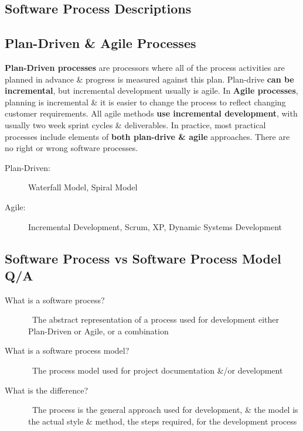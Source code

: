 \documentclass{report}
\begin{document}
\subsection{Software Process Descriptions}

\subsection{Plan-Driven \& Agile Processes}
\textbf{Plan-Driven processes} are processors where all of the process activities are planned in advance \& progress is measured against this plan. Plan-drive \textbf{can be incremental}, but incremental development usually is agile. In \textbf{Agile processes}, planning is incremental \& it is easier to change the process to reflect changing customer requirements. All agile methods \textbf{use incremental development}, with usually two week sprint cycles \& deliverables. In practice, most practical processes include elements of \textbf{both plan-drive \& agile} approaches. There are no right or wrong software processes.
\begin{description}
  \item [Plan-Driven:] Waterfall Model, Spiral Model
  \item [Agile:] Incremental Development, Scrum, XP, Dynamic Systems Development
\end{description}


\subsection{Software Process vs Software Process Model Q/A}
\begin{description}
  \item [What is a software process?] \ \newline The abstract representation of a process used for development either Plan-Driven or Agile, or a combination
  \item [What is a software process model?] \ \newline The process model used for project documentation \&/or development
  \item [What is the difference?] \ \newline The process is the general approach used for development, \& the model is the actual style \& method, the steps required, for the development process
\end{description}
\end{document}
